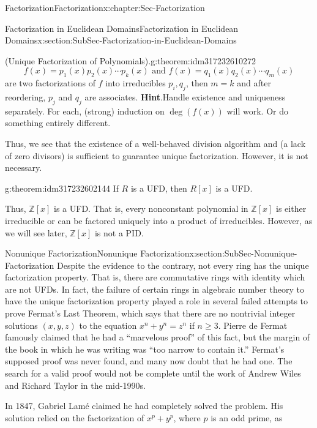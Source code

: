 \documentclass[oneside,10pt,]{book}
\newcommand{\blocktitlefont}{\relax}
\numberwithin{equation}{section}
\renewcommand{\ge}{\geqslant}
\def\Z{{\mathbb Z}}
\begin{document}
\begin{chapterptx}{Factorization}{}{Factorization}{}{}{x:chapter:Sec-Factorization}
\begin{sectionptx}{Factorization in Euclidean Domains}{}{Factorization in Euclidean Domains}{}{}{x:section:SubSec-Factorization-in-Euclidean-Domains}
\begin{theorem}{(Unique Factorization of Polynomials).}{}{g:theorem:idm317232610272}
\begin{equation*}
f(x) = p_1(x) p_2(x) \cdots p_k(x) \text{ and }  f(x) = q_1(x) q_2(x) \cdots q_m(x)
\end{equation*}
are two factorizations of \(f\) into irreducibles \(p_i, q_j\), then \(m=k\) and after reordering, \(p_j\) and \(q_j\) are associates.%
\textbf{\blocktitlefont Hint}.\quad{}Handle existence and uniqueness separately. For each, (strong) induction on \(\deg(f(x))\) will work. Or do something entirely different.%
\end{theorem}
Thus, we see that the existence of a well-behaved division algorithm and (a lack of zero divisors) is sufficient to guarantee unique factorization. However, it is not necessary.%
\begin{theorem}{}{}{g:theorem:idm317232602144}%
If \(R\) is a UFD, then \(R[x]\) is a UFD.%
\end{theorem}
Thus, \(\Z[x]\) is a UFD. That is, every nonconstant polynomial in \(\Z[x]\) is either irreducible or can be factored uniquely into a product of irreducibles.  However, as we will see later, \(\Z[x]\) is not a PID.%
\end{sectionptx}
%
%
\typeout{************************************************}
\typeout{************************************************}
%
\begin{sectionptx}{Nonunique Factorization}{}{Nonunique Factorization}{}{}{x:section:SubSec-Nonunique-Factorization}
Despite the evidence to the contrary, not every ring has the unique factorization property. That is, there are commutative rings with identity which are not UFDs.  In fact, the failure of certain rings in algebraic number theory to have the unique factorization property played a role in several failed attempts to prove Fermat's Last Theorem, which says that there are no nontrivial integer solutions \((x,y,z)\) to the equation \(x^n + y^n = z^n\) if \(n \ge 3\). Pierre de Fermat famously claimed that he had a ``marvelous proof'' of this fact, but the margin of the book in which he was writing was ``too narrow to contain it.'' Fermat's supposed proof was never found, and many now doubt that he had one. The search for a valid proof would not be complete until the work of Andrew Wiles and Richard Taylor in the mid-1990s.%
\par
In 1847, Gabriel Lamé claimed he had completely solved the problem. His solution relied on the factorization of \(x^p + y^p\), where \(p\) is an odd prime, as%
\begin{equation*}

\end{equation*}
\end{sectionptx}
\end{chapterptx}
\end{document}
